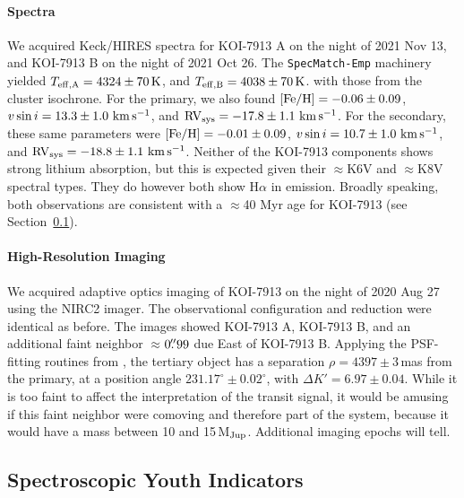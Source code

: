 \documentclass[12pt,twocolumn,tighten,linenumbers,trackchanges]{aastex63}
\newcommand{\mkms}{{\rm \,km\,s^{-1}}}  %
\begin{document}
\paragraph{Spectra}
We acquired Keck/HIRES spectra for KOI-7913 A on the night of 2021 Nov
13, and KOI-7913 B on the night of 2021 Oct 26.  The
\texttt{SpecMatch-Emp} machinery yielded $T_{\rm eff,A} = 4324 \pm
70\,{\rm K}$, and $T_{\rm eff,B} = 4038 \pm 70\,{\rm K}$.   with those from the cluster
isochrone.  For the primary, we also found $[{\rm Fe/H}]= -0.06 \pm
0.09$, $v\sin i = 13.3 \pm 1.0\,\mkms$, and ${\rm RV}_{\rm sys} =
-17.8 \pm 1.1\,\mkms$.  For the secondary, these same parameters were
$[{\rm Fe/H}]= -0.01 \pm 0.09$, $v\sin i = 10.7 \pm 1.0\,\mkms$, and
${\rm RV}_{\rm sys} = -18.8 \pm 1.1\,\mkms$.  Neither of the KOI-7913
components shows strong lithium absorption, but this is expected given
their $\approx$K6V and $\approx$K8V spectral types.  They do however
both show H$\alpha$ in emission.  Broadly speaking, both observations
are consistent with a $\approx$40 Myr age for KOI-7913 (see
Section~\ref{subsec:specyouth}).


\paragraph{High-Resolution Imaging}
We acquired adaptive optics imaging of KOI-7913 on the night of 2020
Aug 27 using the NIRC2 imager.  The observational configuration and
reduction were identical as before.  The images showed KOI-7913 A,
KOI-7913 B, and an additional faint neighbor $\approx$$0\mbox{$.\!\!^{\prime\prime}$}99$ due East
of KOI-7913 B.  Applying the PSF-fitting routines from
\citet{kraus_impact_2016}, the tertiary object has a separation $\rho =
4397 \pm 3$\,mas from the primary, at a position angle $231.17^\circ
\pm 0.02^\circ$, with $\Delta K' = 6.97 \pm 0.04$.  While it is too
faint to affect the interpretation of the transit signal, it would be
amusing if this faint neighbor were comoving and therefore part of the system, 
because it would have a mass between 10 and
15\,M$_{\rm Jup}$.  Additional imaging epochs will tell.


\subsection{Spectroscopic Youth Indicators}
\label{subsec:specyouth}
\end{document}
